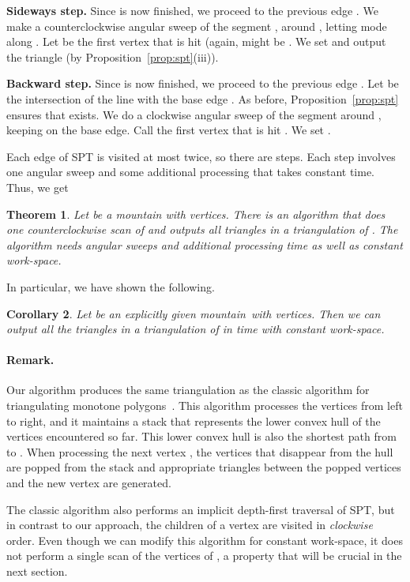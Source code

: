 \documentclass[11pt,a4paper]{article}
\newtheorem{theorem}{Theorem}[section]
\newtheorem{corol}[theorem]{Corollary}
\newcommand{\histogram}{mountain}
\begin{document}
\textbf{Sideways step.}
Since  is now finished, we
proceed to the previous edge .
We make a counterclockwise angular sweep of the segment ,
around , letting  mode along .
Let  be the first vertex that is hit (again,  might be .
We set  and output the
triangle   (by Proposition~\ref{prop:spt}(iii)).

\textbf{Backward step.}
Since  is now finished, we
proceed to the previous edge .
Let  be the intersection of the line 
with the base edge . As before, Proposition~\ref{prop:spt}
ensures that  exists.
We do a clockwise angular sweep of the segment  around
, keeping  on the base edge.
Call the first vertex that is hit .
We set .


Each edge of SPT is visited at most twice, so there are  steps.
Each step involves one angular sweep and some
additional processing that takes constant time. Thus, we get

\begin{theorem}
\label{thm:histo_triang}
Let  be a \histogram{} with  vertices. There is an algorithm
that does one counterclockwise scan of 
and outputs all triangles in a triangulation of .
The algorithm needs  angular sweeps and
additional processing time  as well as constant work-space.
\end{theorem}
In particular, we have shown the following.
\begin{corol}
Let  be an explicitly given \histogram{}\ with  vertices.
Then we can output all the triangles in a triangulation of 
in  time with constant work-space.
\end{corol}

\paragraph{Remark.}
Our algorithm produces the same triangulation as the classic
algorithm for triangulating monotone polygons~\cite{GareyJoPrTa78}.
This algorithm processes the
vertices from left to right, and it
maintains a stack that represents
the lower convex hull of the vertices  encountered
so far.
This lower convex hull is also the shortest path from  to .
 When processing the next vertex ,
 the vertices that disappear from the hull are popped from the stack
 and appropriate triangles between the popped vertices and
 the new vertex are generated.

The classic algorithm also performs an implicit depth-first traversal of SPT,
but in contrast to our approach,
the children
of a vertex are visited in \emph{clockwise} order.
Even though we can modify this algorithm for constant work-space,
it does not perform a single scan of the vertices of , a property that
will be crucial in the next section.
\end{document}
